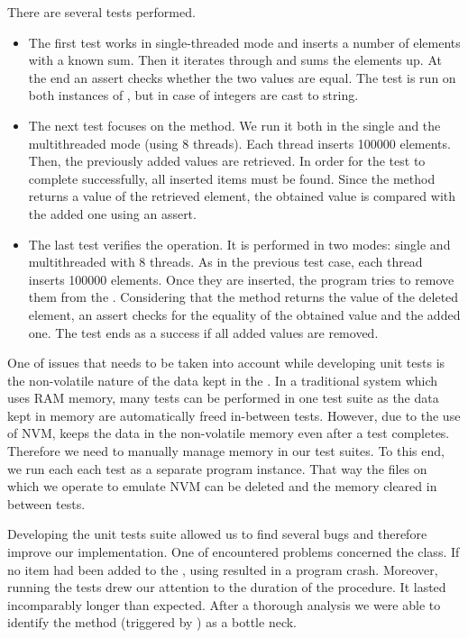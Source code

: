     There are several tests performed.
    \begin{itemize}
    \item The first test works in single-threaded mode and inserts a number of elements with a known sum. 
        Then it iterates through \PHT and sums the elements up. 
        At the end an assert checks whether the two values are equal. 
        The test is run on both instances of \PHT, but in case of \NvmHashMap\stringsMap integers are cast to string.
    \item The next test focuses on the \getMethod method.
        We run it both in the single and the multithreaded mode (using 8 threads). 
        Each thread inserts 100000 elements. 
        Then, the previously added values are retrieved. 
        In order for the test to complete successfully, all inserted items must be found. 
        Since the \getMethod method returns a value of the retrieved element, the obtained value is compared with the added one using an assert.
    \item The last test verifies the \removeMethod operation. 
        It is performed in two modes: single and multithreaded with 8 threads. 
        As in the previous test case, each thread inserts 100000 elements. 
        Once they are inserted, the program tries to remove them from the \PHT. 
        Considering that the \removeMethod method returns the value of the deleted element, an assert checks for the equality of the obtained value and the added one. 
        The test ends as a success if all added values are removed.
    \end{itemize}

    One of issues that needs to be taken into account while developing unit tests is the non-volatile nature of the data kept in the \NvmHashMap. 
    In a traditional system which uses RAM memory, many tests can be performed in one test suite as the data kept in memory are automatically freed in-between tests. 
    However, due to the use of NVM, \PHT keeps the data in the non-volatile memory even after a test completes. 
    Therefore we need to manually manage memory in our test suites.
    To this end, we run each each test as a separate program instance. 
    That way the files on which we operate to emulate NVM can be deleted and the memory cleared in between tests.  

    Developing the unit tests suite allowed us to find several bugs and therefore improve our implementation. 
    One of encountered problems concerned the \Iterator class. 
    If no item had been added to the \PHT, using \Iterator resulted in a program crash.
    Moreover, running the tests drew our attention to the duration of the \insertMethod procedure. 
    It lasted incomparably longer than expected. 
    After a thorough analysis we were able to identify the \expandMethod method (triggered by \insertMethod) as a bottle neck.

